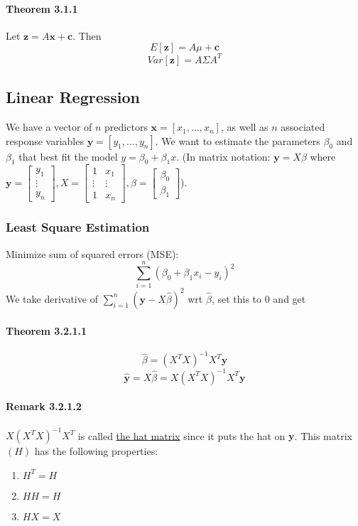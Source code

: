 \documentclass[11pt]{article}
\newcommand{\tb}[1]{\textbf{#1}}
\newcommand{\under}[1]{\underline{#1}}
\newcommand{\vx}[0]{\tb{x}}
\newcommand{\vy}[0]{\tb{y}}
\newcommand{\vz}[0]{\tb{z}}
\newcommand{\vc}[0]{\tb{c}}
\begin{document}
\paragraph{Theorem 3.1.1}
Let $\vz = A\vx + \vc$. Then $$E[\vz] = A\mu + \vc$$
$$Var[\vz] = A\Sigma A^T$$
\subsection{Linear Regression}
We have a vector of $n$ predictors $\vx = [x_1,\hdots,x_n]$, as well as $n$ associated response variables $\vy = [y_1, \hdots, y_n]$. We want to estimate the parameters $\beta_0$ and $\beta_1$ that best fit the model $y = \beta_0 + \beta_1 x$. (In matrix notation: $\vy = X\beta$ where $\vy = \begin{bmatrix}
	y_1 \\ \vdots \\ y_n \end{bmatrix}, X = \begin{bmatrix}
		1 & x_1 \\ \vdots & \vdots \\ 1 & x_n
	\end{bmatrix}, \beta = \begin{bmatrix} \beta_0 \\ \beta_1 \end{bmatrix}$).
\subsubsection{Least Square Estimation}
Minimize sum of squared errors (MSE): $$\sum_{i=1}^n (\beta_0 + \beta_1 x_i - y_i)^2$$
We take derivative of $\sum_{i=1}^n (\vy - X\hat{\beta})^2$ wrt $\hat{\beta}$, set this to 0 and get 
\paragraph{Theorem 3.2.1.1}$$\hat{\beta} = (X^TX)^{-1}X^T\vy$$
$$\hat{\vy} = X\hat{\beta} = X(X^TX)^{-1}X^T\vy$$
\paragraph{Remark 3.2.1.2}
$X(X^TX)^{-1}X^T$ is called \under{the hat matrix} since it puts the hat on $\vy$. This matrix $(H)$ has the following properties:
\begin{enumerate}
    \item $H^T = H$
    \item $HH = H$
    \item $HX = X$
\end{enumerate}
\end{document}
